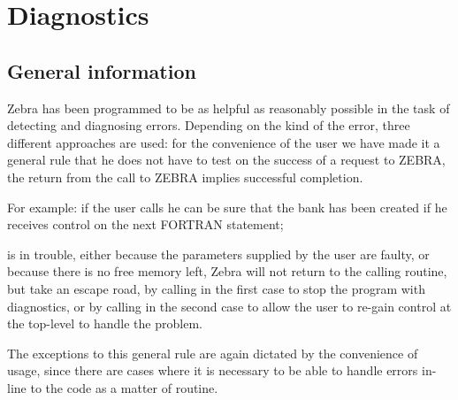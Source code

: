 \chapter{Diagnostics}
\section{General information}
\par Zebra has been programmed to be as helpful as reasonably
possible in the task of detecting and diagnosing errors.
Depending on the kind of the error,
three different approaches are used:
for the convenience of the user we have made it a general rule
that he does not have to test on the success of a request to ZEBRA,
the return from the call to ZEBRA implies successful completion.
\par For example: if the user calls  he can be sure that
the bank has been created if he receives control on the next
FORTRAN statement;
\par {} is in trouble, either because the parameters supplied
by the user are faulty,
or because there is no free memory left,
Zebra will not return to the calling routine,
but take an escape road,
by calling  in the first case to stop the program with
diagnostics,
or by calling  in the second case to allow the user
to re-gain control at the top-level to handle the problem.
\par The exceptions to this general rule are again dictated by the
convenience of usage,
since there are cases where it is necessary to be able to
handle errors in-line to the code as a matter of routine.
